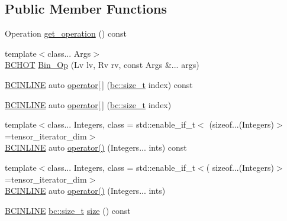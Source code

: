 \subsection*{Public Member Functions}
\begin{DoxyCompactItemize}
\item 
Operation \hyperlink{structbc_1_1tensors_1_1exprs_1_1Bin__Op_a767518d5bd0acf986a00f69d044994f8}{get\+\_\+operation} () const
\item 
{\footnotesize template$<$class... Args$>$ }\\\hyperlink{common_8h_ac085f07cc309e3aac24aa3fc0a40f6d2}{B\+C\+H\+OT} \hyperlink{structbc_1_1tensors_1_1exprs_1_1Bin__Op_a573cf3bb0dda167af2e6ca585c584fd9}{Bin\+\_\+\+Op} (Lv lv, Rv rv, const Args \&... args)
\item 
\hyperlink{common_8h_a6699e8b0449da5c0fafb878e59c1d4b1}{B\+C\+I\+N\+L\+I\+NE} auto \hyperlink{structbc_1_1tensors_1_1exprs_1_1Bin__Op_a0034e76e2f2b0f48de36f38055336e4e}{operator\mbox{[}$\,$\mbox{]}} (\hyperlink{namespacebc_aaf8e3fbf99b04b1b57c4f80c6f55d3c5}{bc\+::size\+\_\+t} index) const
\item 
\hyperlink{common_8h_a6699e8b0449da5c0fafb878e59c1d4b1}{B\+C\+I\+N\+L\+I\+NE} auto \hyperlink{structbc_1_1tensors_1_1exprs_1_1Bin__Op_a4f15e91266888a28f787ed18ecbffe00}{operator\mbox{[}$\,$\mbox{]}} (\hyperlink{namespacebc_aaf8e3fbf99b04b1b57c4f80c6f55d3c5}{bc\+::size\+\_\+t} index)
\item 
{\footnotesize template$<$class... Integers, class  = std\+::enable\+\_\+if\+\_\+t$<$				(sizeof...(\+Integers)$>$=tensor\+\_\+iterator\+\_\+dim$>$ }\\\hyperlink{common_8h_a6699e8b0449da5c0fafb878e59c1d4b1}{B\+C\+I\+N\+L\+I\+NE} auto \hyperlink{structbc_1_1tensors_1_1exprs_1_1Bin__Op_a56599cd99d7f1dac59cada714a03018f}{operator()} (Integers... ints) const
\item 
{\footnotesize template$<$class... Integers, class  = std\+::enable\+\_\+if\+\_\+t$<$(				sizeof...(\+Integers)$>$=tensor\+\_\+iterator\+\_\+dim$>$ }\\\hyperlink{common_8h_a6699e8b0449da5c0fafb878e59c1d4b1}{B\+C\+I\+N\+L\+I\+NE} auto \hyperlink{structbc_1_1tensors_1_1exprs_1_1Bin__Op_a8465e6a42066c4ab94d564fedf33b475}{operator()} (Integers... ints)
\item 
\hyperlink{common_8h_a6699e8b0449da5c0fafb878e59c1d4b1}{B\+C\+I\+N\+L\+I\+NE} \hyperlink{namespacebc_aaf8e3fbf99b04b1b57c4f80c6f55d3c5}{bc\+::size\+\_\+t} \hyperlink{structbc_1_1tensors_1_1exprs_1_1Bin__Op_a78c087617de82b25b275e80d4171d096}{size} () const

\end{DoxyCompactItemize}
